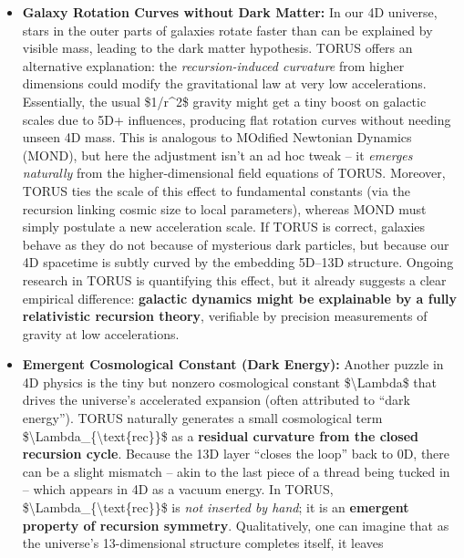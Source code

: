 \documentclass[
]{article}
\begin{document}
\begin{itemize}
\item
  \textbf{Galaxy Rotation Curves without Dark Matter:} In our 4D
  universe, stars in the outer parts of galaxies rotate faster than can
  be explained by visible mass, leading to the dark matter hypothesis.
  TORUS offers an alternative explanation: the \emph{recursion-induced
  curvature} from higher dimensions could modify the gravitational law
  at very low accelerations\hspace{0pt}. Essentially, the usual
  \$1/r\^{}2\$ gravity might get a tiny boost on galactic scales due to
  5D+ influences, producing flat rotation curves without needing unseen
  4D mass. This is analogous to MOdified Newtonian Dynamics (MOND), but
  here the adjustment isn't an ad hoc tweak -- it \emph{emerges
  naturally} from the higher-dimensional field equations of
  TORUS\hspace{0pt}. Moreover, TORUS ties the scale of this effect to
  fundamental constants (via the recursion linking cosmic size to local
  parameters), whereas MOND must simply postulate a new acceleration
  scale. If TORUS is correct, galaxies behave as they do not because of
  mysterious dark particles, but because our 4D spacetime is subtly
  curved by the embedding 5D--13D structure. Ongoing research in TORUS
  is quantifying this effect, but it already suggests a clear empirical
  difference: \textbf{galactic dynamics might be explainable by a fully
  relativistic recursion theory}, verifiable by precision measurements
  of gravity at low accelerations.
\item
  \textbf{Emergent Cosmological Constant (Dark Energy):} Another puzzle
  in 4D physics is the tiny but nonzero cosmological constant
  \$\textbackslash Lambda\$ that drives the universe's accelerated
  expansion (often attributed to ``dark energy''). TORUS naturally
  generates a small cosmological term
  \$\textbackslash Lambda\_\{\textbackslash text\{rec\}\}\$ as a
  \textbf{residual curvature from the closed recursion
  cycle}\hspace{0pt}. Because the 13D layer ``closes the loop'' back to
  0D, there can be a slight mismatch -- akin to the last piece of a
  thread being tucked in -- which appears in 4D as a vacuum energy. In
  TORUS, \$\textbackslash Lambda\_\{\textbackslash text\{rec\}\}\$ is
  \emph{not inserted by hand}; it is an \textbf{emergent property of
  recursion symmetry}\hspace{0pt}. Qualitatively, one can imagine that
  as the universe's 13-dimensional structure completes itself, it leaves

\end{itemize}
\end{document}
